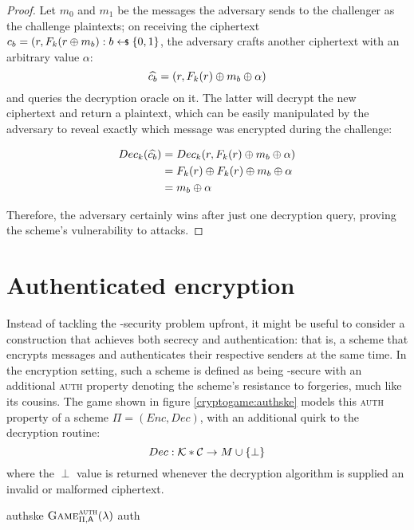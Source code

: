 \begin{proof}

    Let $m_0$ and $m_1$ be the messages the adversary sends to the challenger as the challenge plaintexts; on receiving the ciphertext $c_b = (r, F_k(r \xor m_b) : b \pickUAR \{0, 1\}$, the adversary crafts another ciphertext with an arbitrary value $\alpha$:
    \[
        \widehat{c_b} = (r, F_k(r) \oplus m_b \oplus \alpha)
    \]
    and queries the decryption oracle on it. The latter will decrypt the new ciphertext and return a plaintext, which can be easily manipulated by the adversary to reveal exactly which message was encrypted during the challenge:

    \begin{align*}
        Dec_k(\widehat{c_b}) &= Dec_k(r, F_k(r) \oplus m_b \oplus \alpha) \\
        &= F_k(r) \oplus F_k(r) \oplus m_b \oplus \alpha \\
        &= m_b \oplus \alpha
    \end{align*}

    Therefore, the adversary certainly wins after just one decryption query, proving the scheme's vulnerability to \cca{} attacks.
   
\end{proof}

\section{Authenticated encryption}

Instead of tackling the \cca-security problem upfront, it might be useful to consider a construction that achieves both secrecy and authentication: that is, a scheme that encrypts messages and authenticates their respective senders at the same time. In the encryption setting, such a scheme is defined as being \cpa-secure with an additional \textsc{auth} property denoting the scheme's resistance to forgeries, much like its \mac{} cousins. The game shown in figure \ref{cryptogame:authske} models this \textsc{auth} property of a scheme $\Pi = (Enc, Dec)$, with an additional quirk to the decryption routine:
\[
    Dec:\mathcal{K}*\mathcal{C} \to M \cup \{\perp\}
\]
where the $\perp$ value is returned whenever the decryption algorithm is supplied an invalid or malformed ciphertext.

\begin{cryptogame}
    {authske}
    {$\cryptog{auth}(\lambda)$}
    {auth}


    \cseqbeginloop
    \cseqendloop

    \cseqdelay


\end{cryptogame} 

